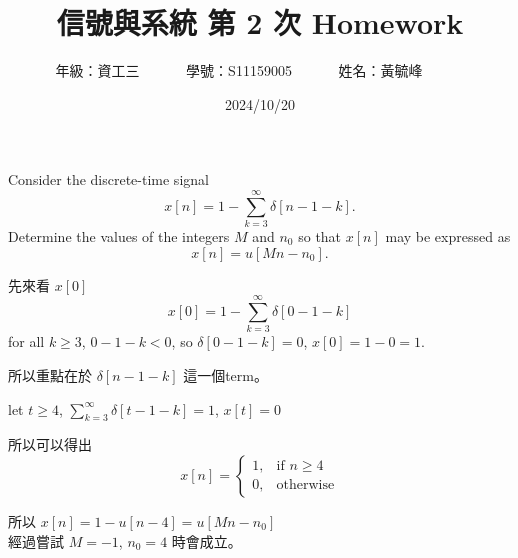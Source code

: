 \documentclass[12pt,a4paper]{article}
\begin{document}
\title{
  {
    \heiti 信號與系統 第 2 次 Homework
  }
}


\date{2024/10/20}
\author{
  年級：{資工三}~~~~~~
  學號：{S11159005}~~~~~~
  姓名：{黃毓峰}~~~~~~
}

\maketitle
\newlength{\question}
\settowidth{\question}{XX}

\section*{\heiti \color{black}{Question - 1.12}}

\parbox[t]{\dimexpr\linewidth-\question}{
  Consider the discrete-time signal
  \[
    x[n] = 1 - \sum_{k=3}^{\infty} \delta[n - 1 - k].
  \]
      Determine the values of the integers \(M\) and \(n_0\) so that \(x[n]\) may be expressed as
  \[
  x[n] = u[Mn - n_0].
  \]
  
}


\parbox[t]{\dimexpr\linewidth-\question} {
  先來看 \(x[0]\)
  \[
    x[0] = 1 - \sum_{k=3}^{\infty} \delta[0 - 1 - k]
  \]
  for all \(k \geq 3\), \(0 - 1 - k < 0\), so \(\delta[0 - 1 - k] = 0\),
  \(
    x[0] = 1 - 0 = 1.
  \)

  所以重點在於 \(\delta[n - 1 - k]\) 這一個term。

  let \(t \geq 4\),  \(\sum_{k=3}^{\infty} \delta[t - 1 - k] = 1\),  \(x[t] = 0\)

  所以可以得出
  \[
    x[n] = 
      \begin{cases}
          1,              & \text{if } n\geq 4\\
          0,              & \text{otherwise}
      \end{cases}
  \]

  所以 \(x[n]=1- u[n-4]=u[Mn-n_0]\)\\
  經過嘗試\footnotemark{} \(M = -1\), \(n_0 = 4\) 時會成立。
}

\newpage

\section*{\heiti \color{black}{Question - 1.15}}
\end{document}
